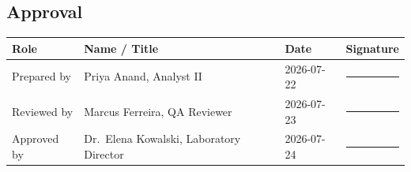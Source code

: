 \subsection*{Approval}
\begin{table}[h!]
\centering
\small
\begin{tabularx}{\linewidth}{@{}X X l l@{}}
\toprule
\textbf{Role} & \textbf{Name / Title} & \textbf{Date} & \textbf{Signature} \\
\midrule
Prepared by & Priya Anand, Analyst II & 2026-07-22 & \rule{3cm}{0.4pt} \\
Reviewed by & Marcus Ferreira, QA Reviewer & 2026-07-23 & \rule{3cm}{0.4pt} \\
Approved by & Dr.\ Elena Kowalski, Laboratory Director & 2026-07-24 & \rule{3cm}{0.4pt} \\
\bottomrule
\end{tabularx}
\end{table}



